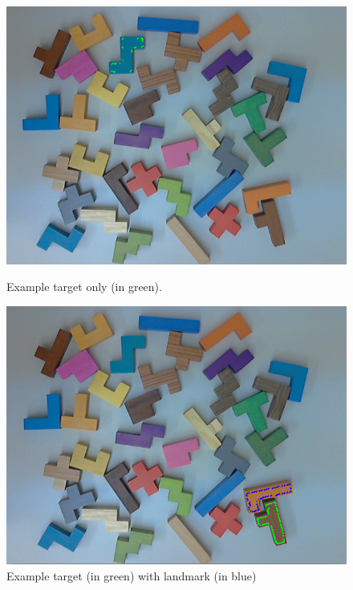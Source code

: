 \documentclass[a4paper,10pt]{article}
\begin{document}
\begin{figure}[ht]
\begin{minipage}{0.3\linewidth} 
\centering
      \includegraphics[width=1.0\textwidth]{targetonly.png}	
      \caption{Example target only (in green).\label{fig1}}
\end{minipage}
\hspace{0.25cm}
\begin{minipage}{0.3\linewidth} 
\centering
      \includegraphics[width=1.0\textwidth]{relative.png}	
      \caption{Example target (in green) with landmark (in blue)\label{fig2}}
\end{minipage}
\hspace{0.25cm}
\begin{minipage}{0.3\linewidth} 

\end{minipage}
\end{figure}
\end{document}
